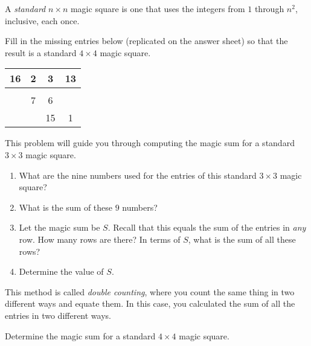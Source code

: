 \documentclass[11pt]{article}
\renewenvironment{problem}{\begin{problems}}{\end{problems}\vspace{5pt}}
\begin{document}
\begin{definition}
A \textit{standard} $n \times n$ magic square is one that uses the integers from $1$ through $n^2$, inclusive, each once.
\end{definition}

\begin{problem}[4 points]
Fill in the missing entries below (replicated on the answer sheet) so that the result is a standard $4 \times 4$ magic square.

\begin{center}
\begin{tabular}{|c|c|c|c|}
\hline
16 & 2 & 3 & 13 \\ \hline
\phantom{5} & \phantom{11} & \phantom{10} & \phantom{8} \\ \hline
\phantom{9} & 7 & 6 & \phantom{12} \\ \hline
\phantom{4} & \phantom{14} & 15 & 1 \\ \hline
\end{tabular}
\end{center}
\end{problem}

\begin{problem}[5=1+1+1+2 points]
This problem will guide you through computing the magic sum for a standard $3 \times 3$ magic square.

\begin{enumerate}[label=(\alph*)]
\item What are the nine numbers used for the entries of this standard $3 \times 3$ magic square?

\item What is the sum of these $9$ numbers?

\item Let the magic sum be $S$. Recall that this equals the sum of the entries in \textit{any} row. How many rows are there? 
In terms of $S$, what is the sum of all these rows?

\item Determine the value of $S$.
\end{enumerate}
\end{problem}

This method is called \textit{double counting}, where you count the same thing in two different ways and equate them.
In this case, you calculated the sum of all the entries in two different ways.

\begin{problem}[3 points]
Determine the magic sum for a standard $4 \times 4$ magic square.
\end{problem}
\end{document}
